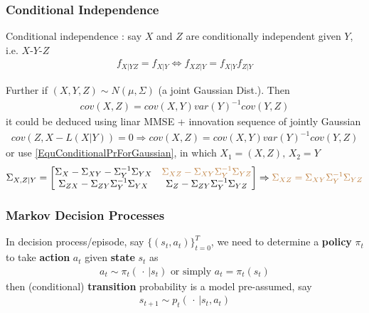 \subsubsection{Conditional Independence}
Conditional independence : say $ X $ and $ Z $ are conditionally independent given $ Y $, i.e. $ X $-$ Y $-$ Z $
\begin{align}
    f_{X|YZ}=f_{X|Y}\Leftrightarrow f_{XZ|Y}=f_{X|Y}f_{Z|Y} 
\end{align}

Further if $ (X,Y,Z)\sim N(\mu ,\Sigma ) $ (a joint Gaussian Dist.). Then
\begin{align}
    cov(X,Z)=cov(X,Y)var(Y)^{-1}cov(Y,Z)
\end{align}
it could be deduced using linar MMSE + innovation sequence of jointly Gaussian
\begin{align}
    cov(Z,X-L(X|Y))=0\Rightarrow cov(X,Z)= cov(X,Y)var(Y)^{-1}cov(Y,Z)
\end{align}
or use \autoref{EquConditionalPrForGaussian}, in which $ X_1=(X,Z),\,X_2=Y $
\begin{align}
    \Sigma _{X,Z|Y}=\begin{bmatrix}
        \Sigma _{X}-\Sigma _{XY}-\Sigma _{Y}^{-1}\Sigma _{YX}&\color{brown}\Sigma _{XZ}-\Sigma _{XY}\Sigma _{Y}^{-1}\Sigma _{YZ}\\
        \Sigma _{ZX}-\Sigma _{ZY}\Sigma _Y^{-1}\Sigma _{YX}&\Sigma _{Z}-\Sigma _{ZY}\Sigma _Y^{-1}\Sigma _{YZ}
    \end{bmatrix} \Rightarrow {\color{brown}\Sigma _{XZ}=\Sigma _{XY}\Sigma _{Y}^{-1}\Sigma _{YZ}}
\end{align}





\subsubsection{Markov Decision Processes}
In decision process/episode, say $ \{(s_t,a_t)\}_{t=0}^T $, we need to determine a \textbf{policy} $ \pi_t $ to take \textbf{action}  $ a_t $ given \textbf{state}  $ s_t $ as
\begin{align}
    a_t\sim \pi_t(\, \cdot \,| s_t) \text{ or simply }a_t=\pi_t(s_t)
\end{align}
then (conditional) \textbf{transition}  probability is a model pre-assumed, say
\begin{align}
    s_{t+1}\sim p_t\left(\, \cdot \, |s_t,a_t\right) 
\end{align}


